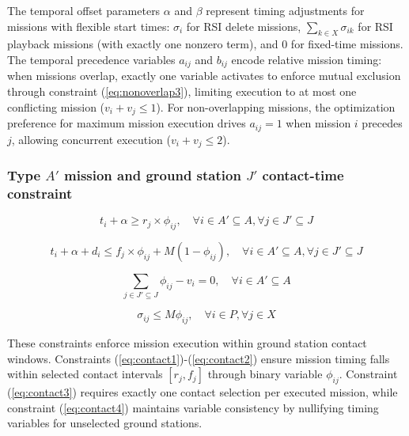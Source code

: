 \documentclass[preprint,3p,12pt,authoryear]{elsarticle}
\begin{document}
\noindent The temporal offset parameters $\alpha$ and $\beta$ represent timing adjustments for missions with flexible start times: $\sigma_i$ for RSI delete missions, $\sum_{k \in X} \sigma_{ik}$ for RSI playback missions (with exactly one nonzero term), and 0 for fixed-time missions. The temporal precedence variables $a_{ij}$ and $b_{ij}$ encode relative mission timing: when missions overlap, exactly one variable activates to enforce mutual exclusion through constraint (\ref{eq:nonoverlap3}), limiting execution to at most one conflicting mission ($v_i + v_j \leq 1$). For non-overlapping missions, the optimization preference for maximum mission execution drives $a_{ij} = 1$ when mission $i$ precedes $j$, allowing concurrent execution ($v_i + v_j \leq 2$).

\subsubsection{Type $A'$ mission and ground station $J'$ contact-time constraint}
\begin{equation}
t_i+\alpha \ge r_j \times \phi_{ij}, \quad \forall i \in A' \subseteq A, \forall j \in J' \subseteq J \label{eq:contact1}
\end{equation}

\begin{equation}
t_i+\alpha+d_i \le f_j \times \phi_{ij} + M(1-\phi_{ij}), \quad \forall i \in A' \subseteq A, \forall j \in J' \subseteq J \label{eq:contact2}
\end{equation}

\begin{equation}
\sum_{j \in J' \subseteq J} \phi_{ij}-v_i = 0, \quad \forall i \in A' \subseteq A \label{eq:contact3}
\end{equation}

\begin{equation}
\sigma_{ij} \le M\phi_{ij}, \quad \forall i \in P, \forall j \in X \label{eq:contact4}
\end{equation}

These constraints enforce mission execution within ground station contact windows. Constraints (\ref{eq:contact1})-(\ref{eq:contact2}) ensure mission timing falls within selected contact intervals $[r_j, f_j]$ through binary variable $\phi_{ij}$. Constraint (\ref{eq:contact3}) requires exactly one contact selection per executed mission, while constraint (\ref{eq:contact4}) maintains variable consistency by nullifying timing variables for unselected ground stations.
\end{document}
